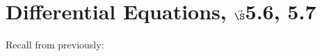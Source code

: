 


%
%
%

\section{{Differential Equations, $\vec\S$5.6, 5.7}}%
% 

%
\thispagestyle{fancy}

Recall from previously:

